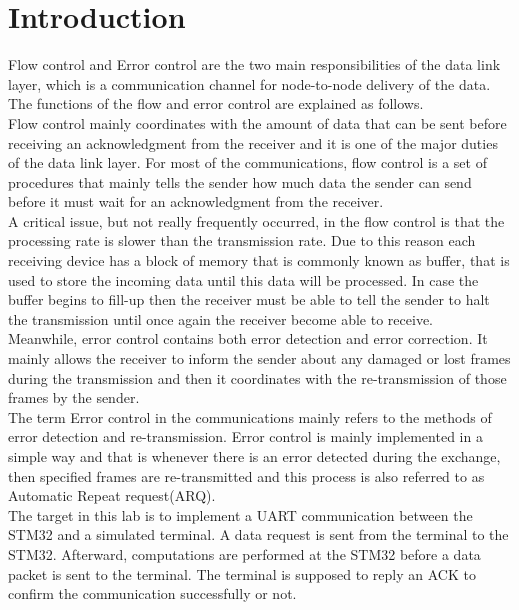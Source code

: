 
\section{Introduction}
Flow control and Error control are the two main responsibilities of the data link layer, which is a communication channel for node-to-node delivery of the data. The functions of the flow and error control are explained as follows.\\

Flow control mainly coordinates with the amount of data that can be sent before receiving an acknowledgment from the receiver and it is one of the major duties of the data link layer. For most of the communications, flow control is a set of procedures that mainly tells the sender how much data the sender can send before it must wait for an acknowledgment from the receiver.\\

A critical issue, but not really frequently occurred, in the flow control is that the processing rate is slower than the transmission rate. Due to this reason each receiving device has a block of memory that is commonly known as buffer, that is used to store the incoming data until this data will be processed. In case the buffer begins to fill-up then the receiver must be able to tell the sender to halt the transmission until once again the receiver become able to receive.\\

Meanwhile, error control contains both error detection and error correction. It mainly allows the receiver to inform the sender about any damaged or lost frames during the transmission and then it coordinates with the re-transmission of those frames by the sender.\\

The term Error control in the communications mainly refers to the methods of error detection and re-transmission. Error control is mainly implemented in a simple way and that is whenever there is an error detected during the exchange, then specified frames are re-transmitted and this process is also referred to as Automatic Repeat request(ARQ).\\

The target in this lab is to implement a UART communication between the STM32 and a simulated terminal. A data request is sent from the terminal to the STM32. Afterward, computations are performed at the STM32 before a data packet is sent to the terminal. The terminal is supposed to reply an ACK to confirm the communication successfully or not.

